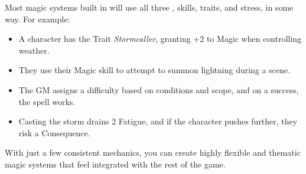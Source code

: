 Most magic systems built in \wyrd will use all three , skills, traits, and stress, in some way. For example:

\begin{itemize}
    \item A character has the Trait \textit{Stormcaller}, granting +2 to Magic when controlling weather.
    \item They use their Magic skill to attempt to summon lightning during a scene.
    \item The GM assigns a difficulty based on conditions and scope, and on a success, the spell works.
    \item Casting the storm drains 2 Fatigue, and if the character pushes further, they risk a Consequence.
\end{itemize}

With just a few consistent mechanics, you can create highly flexible and thematic magic systems that feel integrated with the rest of the game.

